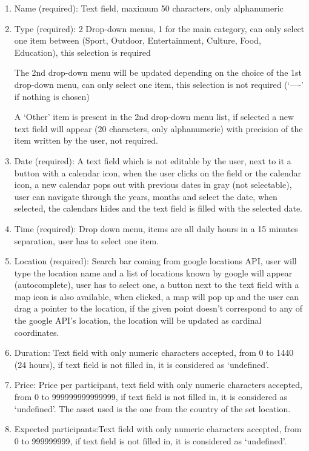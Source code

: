\documentclass[conference]{IEEEtran}
\begin{document}
\begin{enumerate}

\item Name (required): Text field, maximum 50 characters, only alphanumeric
\item Type (required): 2 Drop-down menus, 1 for the main category, can only select one item between (Sport, Outdoor, Entertainment, Culture, Food, Education), this selection is required

The 2nd drop-down menu will be updated depending on the choice of the 1st drop-down menu, can only select one item, this selection is not required (‘----’ if nothing is chosen)

A ‘Other’ item is present in the 2nd drop-down menu list, if selected a new text field will appear (20 characters, only alphanumeric) with precision of the item written by the user, not required.
\item Date (required): A text field which is not editable by the user, next to it a button with a calendar icon, when the user clicks on the field or the calendar icon, a new calendar pops out with previous dates in gray (not selectable), user can navigate through the years, months and select the date, when selected, the calendars hides and the text field is filled with the selected date.
\item Time (required): Drop down menu, items are all daily hours in a 15 minutes separation, user has to select one item.
\item Location (required): Search bar coming from google locations API, user will type the location name and a list of locations known by google will appear (autocomplete), user has to select one, a button next to the text field with a map icon is also available, when clicked, a map will pop up and the user can drag a pointer to the location, if the given point doesn’t correspond to any of the google API’s location, the location will be updated as cardinal coordinates.
\item Duration: Text field with only numeric characters accepted, from 0 to 1440 (24 hours), if text field is not filled in, it is considered as ‘undefined’.
\item Price: Price per participant, text field with only numeric characters accepted, from 0 to 999999999999999, if text field is not filled in, it is considered as ‘undefined’. The asset used is the one from the country of the set location.
\item Expected participants:Text field with only numeric characters accepted, from 0 to 999999999, if text field is not filled in, it is considered as ‘undefined’.

\end{enumerate}
\end{document}
